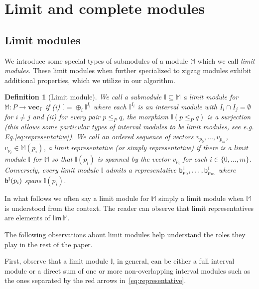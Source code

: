 \documentclass[11pt]{article}
\theoremstyle{plain}%
\newtheorem{definition}{Definition}[section]
\newcommand{\Int}{\mathbb{I}}
\newcommand{\vecsp}{\mathbf{vec}_{\mathbb{F}}}
\newcommand{\M}{\mathbb{M}}
\newcommand{\bs}{{\sf b}}
\newcommand{\limproj}{\mathsf{lim}}
\begin{document}
\section{Limit and complete modules}
\subsection{Limit modules}
We introduce some special types of submodules of a module $\M$ which we call
\emph{limit modules}. These limit modules when further specialized to
zigzag modules exhibit additional properties, which we utilize in our algorithm.

\vspace{0.1in}
\begin{definition}[Limit module]
We call a submodule $\Int \subseteq \M$ a \emph{limit module} for $\M: P\rightarrow \vecsp$ if  
(i) $\Int=\oplus_i \Int^{I_i}$ where each $\Int^{I_i}$ is an interval module with $I_i\cap I_j=\emptyset$ for $i\neq j$
and (ii) for every pair $p\leq_{P} q$, the morphism $\Int (p\leq_{P} q)$ is a surjection (this allows some particular types of interval modules to be limit modules, see e.g. Eq.\eqref{eq:representative}). We call an ordered sequence of vectors $v_{p_0},\ldots,v_{p_m}$, $v_{p_i}\in \M(p_i)$, 
a \emph{limit representative} (or simply \emph{representative}) if there is
a limit module $\Int$ for $\M$ so that $\Int(p_i)$ is spanned by the vector $v_{p_i}$ for each $i\in\{0,\ldots,m\}$. Conversely, every limit module $\Int$ admits a representative
$\bs^{\Int}_{p_0},\ldots,\bs^{\Int}_{p_m}$ where $\bs^{\Int}(p_i)$ spans $\Int(p_i)$.
\label{def:limitmodule}
\end{definition}

In what follows we often say a limit module for $\M$ simply a limit
module when $\M$ is understood from the context.
The reader can observe that limit representatives are elements of $\limproj \, \M$.

The following observations about limit modules 
help understand the roles they play in the rest of the paper.

First, observe that a limit module $\Int$, in general, can be either a full interval module or a direct sum of
one or more non-overlapping interval modules such as the ones separated by the red arrows in~\eqref{eq:representative}. 
\end{document}
